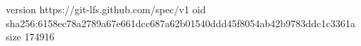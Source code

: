 version https://git-lfs.github.com/spec/v1
oid sha256:6158ec78a2789a67e661dcc687a62b01540ddd45f8054ab42b9783ddc1c3361a
size 174916

